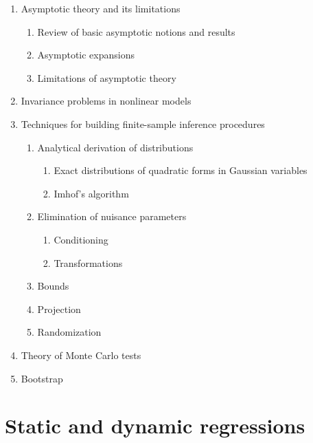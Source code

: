\documentclass[titlepage,11pt,amstex]{article}
\begin{document}
\begin{enumerate}
\item Asymptotic theory and its limitations

\begin{enumerate}
\item Review of basic asymptotic notions and results

\item Asymptotic expansions

\item Limitations of asymptotic theory
\end{enumerate}

\item Invariance problems in nonlinear models

\item Techniques for building finite-sample inference procedures

\begin{enumerate}
\item Analytical derivation of distributions

\begin{enumerate}
\item Exact distributions of quadratic forms in Gaussian variables

\item Imhof's algorithm
\end{enumerate}

\item Elimination of nuisance parameters

\begin{enumerate}
\item Conditioning

\item Transformations
\end{enumerate}

\item Bounds

\item Projection

\item Randomization
\end{enumerate}

\item Theory of Monte Carlo tests

\item Bootstrap
\end{enumerate}

\section{Static and dynamic regressions\textbf{\ \label{Static and dynamic
regressions}}}
\end{document}
